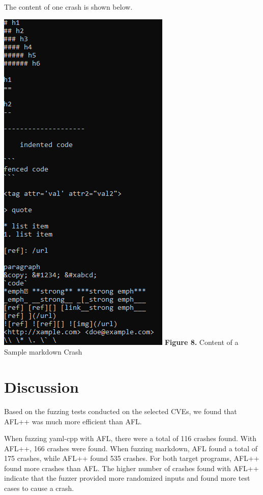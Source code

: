 \documentclass[12pt]{diazessay}
\begin{document}
The content of one crash is shown below.

\begin{center}
    \includegraphics[scale=0.4, trim={0 3cm 0 0}, clip]{markdownsamplecatcrash.png}
    \textbf{Figure 8.} Content of a Sample markdown Crash
\end{center}





\section*{Discussion}

Based on the fuzzing tests conducted on the selected CVEs, we found that AFL++ was much more efficient than AFL. 

When fuzzing yaml-cpp with AFL, there were a total of 116 crashes found. With AFL++, 166 crashes were found. When fuzzing markdown, AFL found a total of 175 crashes, while AFL++ found 535 crashes. For both target programs, AFL++ found more crashes than AFL. The higher number of crashes found with AFL++ indicate that the fuzzer provided more randomized inputs and found more test cases to cause a crash.
\end{document}
